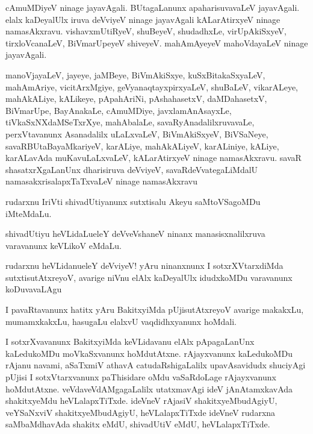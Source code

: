 \begin{mng}
cAmuMDiyeV ninage jayavAgali. BUtagaLanunx apaharisuvavaLeV jayavAgali. elalx kaDeyalUlx iruva deVviyeV ninage jayavAgali kALarAtirxyeV ninage namasAkxravu. vishavxmUtiRyeV, shuBeyeV, shudadhxLe, virUpAkiSxyeV, tirxloVcanaLeV, BiVmarUpeyeV shiveyeV. mahAmAyeyeV mahoVdayaLeV ninage jayavAgali.
\end{mng}

\begin{mng}
manoVjayaLeV, jayeye, jaMBeye, BiVmAkiSxye, kuSxBitakaSxyaLeV, mahAmAriye, vicitArxMgiye, geVyanaqtayxpirxyaLeV, shuBaLeV, vikarALeye, mahAkALiye, kALikeye, pApahAriNi, pAshahasetxV, daMDahasetxV, BiVmarUpe, BayAnakaLe, cAmuMDiye, javxlamAnAsayxLe, tiVkaSxNXdaMSeTxrXye, mahAbalaLe, savaRyAnadalilxruvavaLe, perxVtavanunx Asanadalilx uLaLxvaLeV, BiVmAkiSxyeV, BiVSaNeye, savaRBUtaBayaMkariyeV, karALiye, mahAkALiyeV, karALiniye, kALiye, karALavAda muKavuLaLxvaLeV, kALarAtirxyeV ninage namasAkxravu. savaR shasatxrXgaLanUnx dharisiruva deVviyeV, savaRdeVvategaLiMdalU namasakxrisalapxTaTxvaLeV ninage namasAkxravu
\end{mng}

\begin{mng}
rudarxnu IriVti shivadUtiyanunx sutxtisalu Akeyu saMtoVSagoMDu iMteMdaLu.
\end{mng}

\begin{mng}
shivadUtiyu heVLidaLu\mdash eleY deVveVshaneV ninanx manasisxnalilxruva varavanunx keVLikoV eMdaLu.
\end{mng}

\begin{mng}
rudarxnu heVLidanu\mdash eleY deVviyeV! yAru ninanxnunx I sotxrXVtarxdiMda sutxtisutAtxreyoV, avarige niVnu elAlx kaDeyalUlx idudxkoMDu varavanunx koDuvavaLAgu
\end{mng}

\begin{mng}
I pavaRtavanunx hatitx yAru BakitxyiMda pUjisutAtxreyoV avarige makakxLu, mumamxkakxLu, hasugaLu elalxvU vaqdidhxyanunx hoMdali.
\end{mng}

\begin{mng}
I sotxrXvavanunx BakitxyiMda keVLidavanu elAlx pApagaLanUnx kaLedukoMDu moVkaSxvanunx hoMdutAtxne. rAjayxvanunx kaLedukoMDu rAjanu navami, aSaTxmiV athavA catudaRshigaLalilx upavAsavidudx shuciyAgi pUjisi I sotxVtarxvanunx paThisidare oMdu vaSaRdoLage rAjayxvanunx hoMdutAtxne. veVdaveVdAMgagaLalilx utatxmavAgi ideV jAnAtamxkavAda shakitxyeMdu heVLalapxTiTxde. ideVneV rAjasiV shakitxyeMbudAgiyU, veYSaNxviV shakitxyeMbudAgiyU, heVLalapxTiTxde ideVneV rudarxna saMbaMdhavAda shakitx eMdU, shivadUtiV eMdU, heVLalapxTiTxde.
\end{mng}

